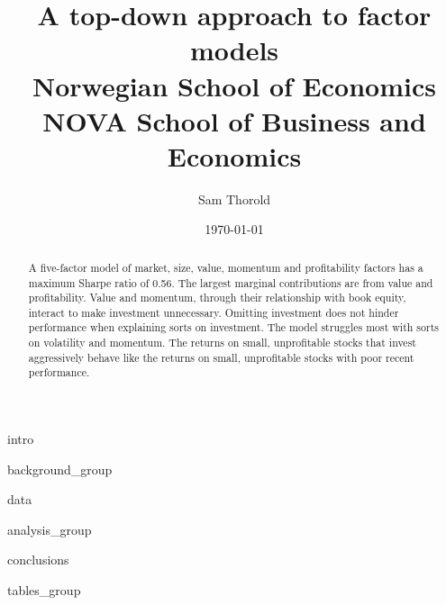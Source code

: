 \documentclass[a4paper, 12pt]{article}
\title{
  {A top-down approach to factor models}\\
  {\large Norwegian School of Economics}\\
  {\large NOVA School of Business and Economics}
}
\author{Sam Thorold}
\date{\today}
\begin{document}
\maketitle


\begin{abstract}
  A five-factor model of
  market, size, value, momentum and profitability factors
  has a maximum Sharpe ratio of 0.56.
  The largest marginal contributions are from value and profitability.
  Value and momentum, through their relationship with book equity,
  interact to make investment unnecessary.
  Omitting investment does not hinder performance when explaining sorts on investment.
  The model struggles most with sorts on volatility and momentum.
  The returns on small, unprofitable stocks that invest aggressively behave
  like the returns on small, unprofitable stocks with poor recent performance.
\end{abstract}

\pagebreak

{intro}

{background_group}

{data}

{analysis_group}

{conclusions}


\printbibliography

\appendix

{tables_group}

\end{document}

